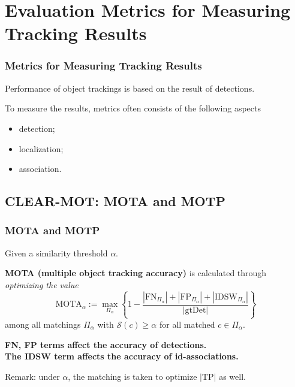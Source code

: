 \documentclass[slidetop, mathserif]{beamer}
\begin{document}


\section{Evaluation Metrics for Measuring Tracking Results}

\begin{frame}
	\frametitle{Metrics for Measuring Tracking Results}
	
	Performance of object trackings is based on the result of detections.
	
	\quad 
	
	To measure the results, metrics often consists of the following aspects
	\begin{itemize}
		\item detection;%
		\item localization;%
		\item association.%
	\end{itemize}
	    
\end{frame}

\subsection{CLEAR-MOT: MOTA and MOTP}

\begin{frame}
	\frametitle{MOTA and MOTP}
	
	
	Given a similarity threshold $\alpha$.
	
	\vspace{4pt}
	
	{\bf MOTA (multiple object tracking accuracy)} is calculated through
	\emph{optimizing the value}
	\[
		\text{MOTA}_\alpha :=
		\max_{\Pi_\alpha}
		\left\{1 - \dfrac{|\text{FN}_{\Pi_\alpha}| + |\text{FP}_{\Pi_\alpha}| + |\text{IDSW}_{\Pi_\alpha}|}{|\text{gtDet}|}\right\}
	\]
	among all matchings $\Pi_\alpha$ with $\mathcal S(c)\geq \alpha$ for all matched $c\in\Pi_\alpha$.
	
	\vspace{4pt}
	
	{\bf\color{blue} FN, FP terms affect the accuracy of detections.} \\
	{\bf\color{olive} The IDSW term affects the accuracy of id-associations.}
	
	\vspace{4pt}

	Remark: under $\alpha$, the matching is taken to optimize $|\text{TP}|$ as well.
	
\end{frame}
\end{document}
